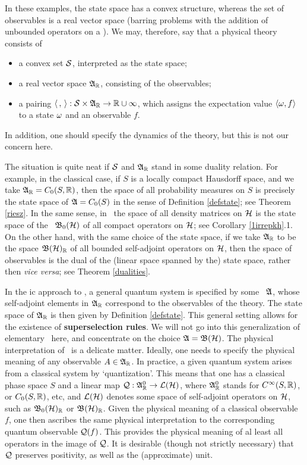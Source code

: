 In these examples, the state space has a convex structure, whereas the set of observables
is a real vector space (barring problems with the addition of unbounded operators on a \Hs).
We may, therefore, say that a physical theory consists of 
\begin{itemize}
\item
a convex set ${\cal S}$, interpreted as
the state space;
\item
a real vector space ${\frak A}_{\Bbb R}$, consisting of the observables;
\item
a pairing  $\langle\, ,\, \rangle:{\cal S}\times{\frak A}_{\Bbb R}\rightarrow{\Bbb R}\cup\infty$, which assigns the expectation value
$\langle\omega,f\rangle$ to a state $\omega$ and an observable $f$. 
\end{itemize}
In addition, one should specify the dynamics of the theory, but this is not our concern here.

The situation is quite neat if ${\cal S}$ and ${\frak A}_{\Bbb R}$ stand in some duality
relation.  For example, in the classical case, if $S$ is a locally
compact Hausdorff space, and we take ${\frak A}_{\Bbb R}=C_0(S,{\Bbb R})$, then the space
of all probability measures on $S$ is precisely the state space of
${\frak A}=C_0(S)$ in the sense of Definition \ref{defstate}; see Theorem
\ref{riesz}. In the same sense, in \qm\ the space of all density
matrices on ${\cal H}$ is the state space of the \ca\ ${\frak B}_0({\cal H})$ of all compact
operators on ${\cal H}$; see Corollary \ref{1irrepkh}.1.  On the other hand,
with the same choice of the state space, if we take ${\frak A}_{\Bbb R}$ to be the
space ${\frak B}({\cal H})_{{\Bbb R}}$ of all bounded self-adjoint operators on ${\cal H}$, then
the space of observables is the dual of the (linear space spanned by
the) state space, rather then {\em vice versa}; see Theorem
\ref{dualities}.

In the \ca ic approach to \qm, a general quantum system is specified
by some \ca\ ${\frak A}$, whose self-adjoint elements in ${\frak A}_{\Bbb R}$
correspond to the observables of the theory. The state space of ${\frak A}_{\Bbb R}$
is then given by Definition \ref{defstate}. This general setting
allows for the existence of {\bf superselection rules}. We will not go
into this generalization of elementary \qm\ here, and concentrate on
the choice ${\frak A}={\frak B}({\cal H})$.   The physical interpretation of
\qm\ is a delicate matter. Ideally, one needs to specify the physical
meaning of any observable $A\in{\frak A}_{\Bbb R}$. In practice, a given quantum
system arises from a classical system by `quantization'. This means
that one has a classical phase space $S$ and a linear map
${\cal Q}:{\frak A}_{\Bbb R}^0\rightarrow {\cal L}({\cal H})$, where ${\frak A}_{\Bbb R}^0$ stands for $C^{\infty}(S,{\Bbb R})$,
or $C_0(S,{\Bbb R})$, etc, and ${\cal L}({\cal H})$ denotes some space of
self-adjoint operators on ${\cal H}$, such as ${\frak B}_0({\cal H})_{{\Bbb R}}$ or
${\frak B}({\cal H})_{{\Bbb R}}$. Given the physical meaning of a classical observable $f$,
one then ascribes the same physical interpretation to the
corresponding quantum observable ${\cal Q}(f)$. This provides the physical
meaning of al least all operators in the image of ${\cal Q}$.  It is
desirable (though not strictly necessary) that ${\cal Q}$ preserves
positivity, as well as the (approximate) unit.

